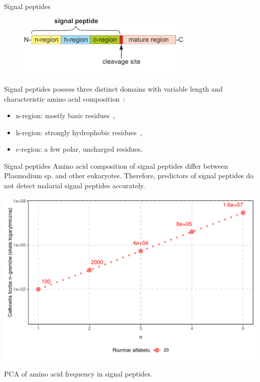 \documentclass{beamer}\usepackage[]{graphicx}\usepackage[]{color}
\makeatletter
\def\maxwidth{ %
  \ifdim\Gin@nat@width>\linewidth
    \linewidth
  \else
    \Gin@nat@width
  \fi
}
\makeatother
\begin{document}
  
\begin{frame}{Signal peptides}

\begin{figure} 
\includegraphics[width=0.75\textwidth]{static_figure/SP.png}
\end{figure}

Signal peptides possess three distinct domains with variable length and characteristic amino acid composition~\citep{hegde_surprising_2006}:
      \begin{itemize}
        \item n-region: mostly basic residues~\citep{nielsen_prediction_1998},
        \item h-region: strongly hydrophobic residues~\citep{nielsen_prediction_1998},
        \item c-region: a few polar, uncharged residues.
      \end{itemize}
\end{frame}



  
\begin{frame}{Signal peptides}  
Amino acid composition of signal peptides differ between Plasmodium sp. and other eukaryotes. Therefore, predictors of signal peptides do not detect malarial signal peptides accurately.


\includegraphics[width=\maxwidth]{figure/unnamed-chunk-1-1} 


PCA of amino acid frequency in signal peptides.
\end{frame}  
\end{document}
